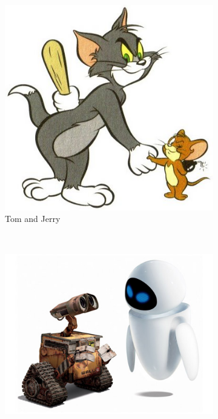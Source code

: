 \documentclass{report}
\begin{document}
\begin{figure}
  \centering
  \begin{subfigure}[b]{0.3\textwidth}
    \includegraphics[width=\textwidth]{TomandJerry.png}
    \caption{Tom and Jerry}
    \label{fig:TomJerry}   
  \end{subfigure}          \\   
  \begin{subfigure}[b]{0.3\textwidth}
    \includegraphics[width=\textwidth]{WallE}

\end{subfigure}
\end{figure}
\end{document}
